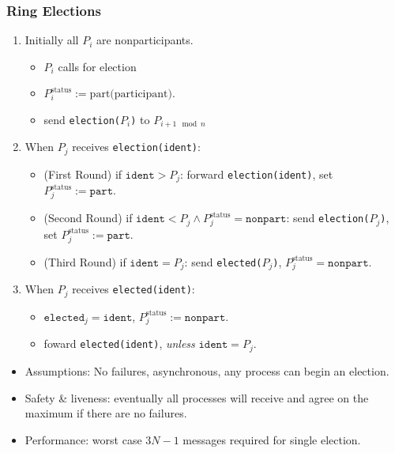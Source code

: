\documentclass[twocolumn,landscape,10pt]{article}
\theoremstyle{definition}
\begin{document}
\subsubsection{Ring Elections}


\begin{enumerate}
    \item Initially all $P_i$ are nonparticipants.
        \begin{itemize}
            \item $P_i$ calls for election
            \item $P_i^\text{status}:=\text{part(participant)}$.
            \item send \texttt{election($P_i$)} to $P_{i+1\mod{n}}$
        \end{itemize} 
    \item When $P_j$ receives \texttt{election(ident)}:
        \begin{itemize}
            \item (First Round) if $\texttt{ident}>P_j$: 
                forward \texttt{election(ident)},
                set $P_j^\text{status}:=\texttt{part}$.
            \item (Second Round) if $\texttt{ident}<P_j\wedge
                P_j^\text{status}=\texttt{nonpart}$:
                send \texttt{election($P_j$)}, 
                set $P_j^\text{status}:=\texttt{part}$.
            \item (Third Round) if $\texttt{ident}=P_j$:
                send \texttt{elected($P_j$)},
                $P_j^\text{status}=\texttt{nonpart}$.
        \end{itemize} 
    \item When $P_j$ receives \texttt{elected(ident)}:
        \begin{itemize}
            \item $\texttt{elected}_j=\texttt{ident}$,
                $P_j^\text{status}:=\texttt{nonpart}$.
            \item foward \texttt{elected(ident)}, \emph{unless}
                $\texttt{ident}=P_j$.
        \end{itemize} 
\end{enumerate} 


\begin{itemize}
    \item Assumptions: No failures, asynchronous, any process can begin an election.
    \item Safety \& liveness: eventually all processes will receive and agree on
        the maximum if there are no failures.
    \item Performance: worst case $3N-1$ messages required for single election.
\end{itemize} 
\end{document}
